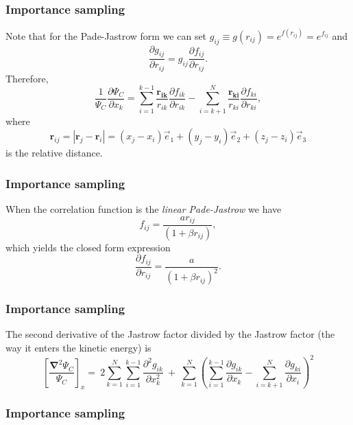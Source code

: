 \documentclass{beamer}
\begin{document}
\begin{frame}
\frametitle{Importance sampling}

\begin{block}{}
Note that for the Pade-Jastrow form we can set $g_{ij} \equiv g(r_{ij}) = e^{f(r_{ij})} = e^{f_{ij}}$ and 
\[
\frac{\partial g_{ij}}{\partial r_{ij}} = g_{ij} \frac{\partial f_{ij}}{\partial r_{ij}}.
\]
Therefore, 
\[
\frac{1}{\Psi_{C}}\frac{\partial \Psi_{C}}{\partial x_k} =
\sum_{i=1}^{k-1}\frac{\mathbf{r_{ik}}}{r_{ik}}\frac{\partial f_{ik}}{\partial r_{ik}}
-\sum_{i=k+1}^{N}\frac{\mathbf{r_{ki}}}{r_{ki}}\frac{\partial f_{ki}}{\partial r_{ki}},
\]
where 
\[
 \mathbf{r}_{ij} = |\mathbf{r}_j - \mathbf{r}_i| = (x_j - x_i)\vec{e}_1 + (y_j - y_i)\vec{e}_2 + (z_j - z_i)\vec{e}_3
\]
is the relative distance. 
\end{block}
\end{frame}

\begin{frame}
\frametitle{Importance sampling}

\begin{block}{}
When the correlation function is the \emph{linear Pade-Jastrow} we have
\[
f_{ij} = \frac{a r_{ij}}{(1 + \beta r_{ij})},
\]
which yields the closed form expression
\[
\frac{\partial f_{ij}}{\partial r_{ij}} = \frac{a}{(1 + \beta r_{ij})^2}.
\]
\end{block}
\end{frame}

\begin{frame}
\frametitle{Importance sampling}

\begin{block}{}
The second derivative of the Jastrow factor divided by the Jastrow factor (the way it enters the kinetic energy) is
\[
\left[\frac{\mathbf{\nabla}^2 \Psi_C}{\Psi_C}\right]_x =\  
2\sum_{k=1}^{N}
\sum_{i=1}^{k-1}\frac{\partial^2 g_{ik}}{\partial x_k^2}\ +\ 
\sum_{k=1}^N
\left(
\sum_{i=1}^{k-1}\frac{\partial g_{ik}}{\partial x_k} -
\sum_{i=k+1}^{N}\frac{\partial g_{ki}}{\partial x_i}
\right)^2
\]
\end{block}
\end{frame}

\begin{frame}
\frametitle{Importance sampling}

\begin{block}{}


\end{block}
\end{frame}
\end{document}
